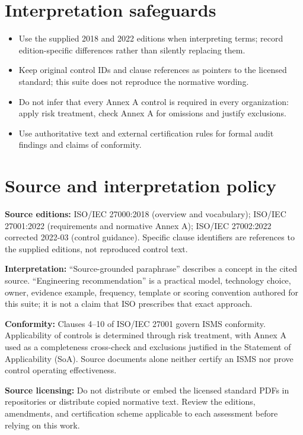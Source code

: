 \documentclass[11pt,letterpaper]{article}
\begin{document}
\section{Interpretation safeguards}
\begin{itemize}
\item Use the supplied 2018 and 2022 editions when interpreting terms; record edition-specific differences rather than silently replacing them.
\item Keep original control IDs and clause references as pointers to the licensed standard; this suite does not reproduce the normative wording.
\item Do not infer that every Annex A control is required in every organization: apply risk treatment, check Annex A for omissions and justify exclusions.
\item Use authoritative text and external certification rules for formal audit findings and claims of conformity.
\end{itemize}

\clearpage\section*{Source and interpretation policy}
\textbf{Source editions:} ISO/IEC 27000:2018 (overview and vocabulary); ISO/IEC 27001:2022 (requirements and normative Annex A); ISO/IEC 27002:2022 corrected 2022-03 (control guidance). Specific clause identifiers are references to the supplied editions, not reproduced control text.\par
\textbf{Interpretation:} ``Source-grounded paraphrase'' describes a concept in the cited source. ``Engineering recommendation'' is a practical model, technology choice, owner, evidence example, frequency, template or scoring convention authored for this suite; it is not a claim that ISO prescribes that exact approach.\par
\textbf{Conformity:} Clauses 4--10 of ISO/IEC 27001 govern ISMS conformity. Applicability of controls is determined through risk treatment, with Annex A used as a completeness cross-check and exclusions justified in the Statement of Applicability (SoA). Source documents alone neither certify an ISMS nor prove control operating effectiveness.\par
\textbf{Source licensing:} Do not distribute or embed the licensed standard PDFs in repositories or distribute copied normative text. Review the editions, amendments, and certification scheme applicable to each assessment before relying on this work.\par
\end{document}
